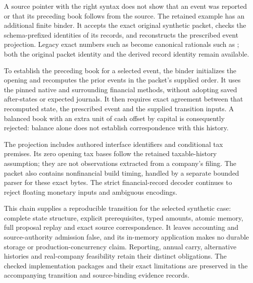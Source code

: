 A source pointer with the right syntax does not show that an event was reported
or that its preceding book follows from the source. The retained example has an
additional finite binder. It accepts the exact original synthetic packet,
checks the schema-prefixed identities of its records, and reconstructs the
prescribed event projection. Legacy exact numbers such as  become
canonical rationals such as ; both the original packet identity and
the derived record identity remain available.

To establish the preceding book for a selected event, the binder initializes the
opening and recomputes the prior events in the packet's supplied order. It uses
the pinned native and surrounding financial methods, without adopting saved
after-states or expected journals. It then requires exact agreement between that
recomputed state, the prescribed event and the supplied transition inputs. A
balanced book with an extra unit of cash offset by capital is consequently
rejected: balance alone does not establish correspondence with this history.

The projection includes authored interface identifiers and conditional tax
premises. Its zero opening tax bases follow the retained taxable-history
assumption; they are not observations extracted from a company's filing. The
packet also contains nonfinancial build timing, handled by a separate bounded
parser for these exact bytes. The strict financial-record decoder continues to
reject floating monetary inputs and ambiguous encodings.

This chain supplies a reproducible transition for the selected synthetic case:
complete state structure, explicit prerequisites, typed amounts, atomic memory,
full proposal replay and exact source correspondence. It leaves accounting and
source-authority admission false, and its in-memory application makes no durable
storage or production-concurrency claim. Reporting, annual carry, alternative
histories and real-company feasibility retain their distinct obligations. The
checked implementation packages and their exact limitations are preserved in
the accompanying transition and source-binding evidence records.
